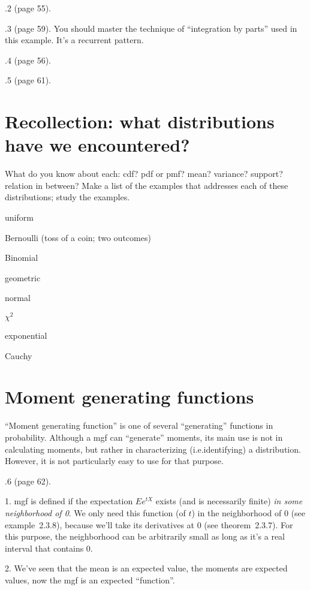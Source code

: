 \documentclass[12pt]{article}
\begin{document}
.2 (page 55).

.3 (page 59). You should master the technique of
``integration by parts'' used in this example. It's a recurrent pattern.

.4 (page 56).

.5 (page 61).

\section{Recollection: what distributions have we encountered?}

What do you know about each:
cdf?
pdf or pmf?
mean?
variance?
support?
relation in between?
Make a list of the examples that addresses each of
these distributions; study the examples.
\medskip

uniform
\medskip

Bernoulli (toss of a coin; two outcomes)
\medskip

Binomial
\medskip

geometric
\medskip

normal
\medskip

$\chi^2$
\medskip

exponential
\medskip

Cauchy

\section{Moment generating functions}

``Moment generating function'' is one of several ``generating''
functions in probability. Although a mgf can ``generate'' moments,
its main use is not in calculating moments, but rather in characterizing
(i.e.\@ identifying) a distribution.
However, it is not particularly easy to use for that purpose.

.6 (page 62).

\alert
1.
mgf is defined if the expectation $E e^{tX}$ exists (and is
necessarily finite) \emph{in some neighborhood of 0}.
We only need this function (of $t$) in the neighborhood of 0
(see example~2.3.8),
because we'll take its derivatives at 0 (see theorem~2.3.7).
For this purpose, the neighborhood can be arbitrarily small
as long as it's a real interval that contains 0.

2.
We've seen that the mean is an expected value, the moments are expected
values, now the mgf is an expected ``function''.
\end{document}
